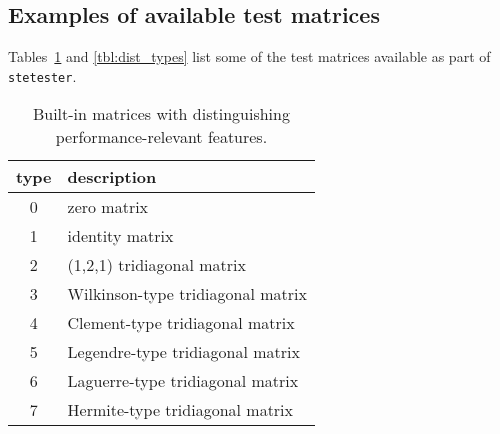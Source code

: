\documentclass[acmtoms]{acmtrans2m}
\begin{document}
\clearpage
\subsection{Examples of available test matrices} 
\label{sec:testmatsoverview}

Tables~\ref{tbl:mtrx_types}  and \ref{tbl:dist_types}   
list some of the test matrices available as part of {\tt stetester}.

\begin{table}[htbp]
\protect \caption{Built-in matrices with distinguishing performance-relevant
                  features.} 
         \label{tbl:mtrx_types} 
\begin{center}
\begin{tabular}{cl} \hline
type & description \\ \hline\hline
  0  & zero matrix \\
  1  & identity matrix \\
  2  & (1,2,1) tridiagonal matrix \\
  3  & Wilkinson-type tridiagonal matrix \\
  4  & Clement-type tridiagonal matrix \\ 
  5  & Legendre-type  tridiagonal matrix\\ 
  6  & Laguerre-type  tridiagonal matrix\\ 
  7  & Hermite-type  tridiagonal matrix\\ 
\hline
\end{tabular}
\end{center}
\end{table}
\end{document}
